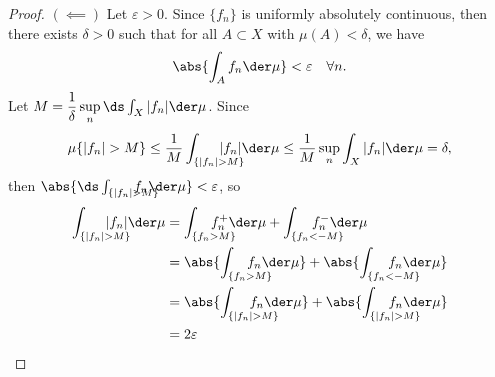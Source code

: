 \documentclass[12pt,letterpaper]{article}
\begin{document}
\begin{proof}$(\impliedby)$
Let $\varepsilon>0$. Since $\{f_n\}$ is uniformly absolutely continuous, then there exists $\delta>0$ such that for all $A\subset X$ with $\mu(A)<\delta$, we have 
$$ \abs{\int_{A}f_n \der \mu}<\varepsilon \quad \forall n. $$
Let $M=\dfrac{1}{\delta}\sup\limits_n \ds\int_X |f_n|\der\mu$. Since 
$$ \mu\{|f_n|>M\} 
\leq \frac{1}{M}\int_{\{|f_n|>M\}} \hspace*{-2em}|f_n| \der\mu 
\leq \frac{1}{M}\sup_n\int_{X} |f_n| \der\mu 
= \delta,$$
then $ \abs{\ds\int_{\{|f_n|>M\}} \hspace*{-2em} f_n \der \mu}<\varepsilon $, so 
\begin{align*}
\int_{\{|f_n|>M\}} \hspace*{-2em} |f_n| \der \mu 
&= \int_{\{f_n>M\}} \hspace*{-2em} f_n^+ \der \mu + \int_{\{f_n<-M\}} \hspace*{-2.5em} f_n^- \der \mu \\
&= \abs{\int_{\{f_n>M\}} \hspace*{-2em} f_n \der \mu} + \abs{\int_{\{f_n<-M\}} \hspace*{-2.5em} f_n \der \mu} \\
&= \abs{\int_{\{|f_n|>M\}} \hspace*{-2.3em} f_n \der \mu} + \abs{\int_{\{|f_n|>M\}} \hspace*{-2.5em} f_n \der \mu} \\
&= 2\varepsilon
\end{align*}
\end{proof}
\end{document}
